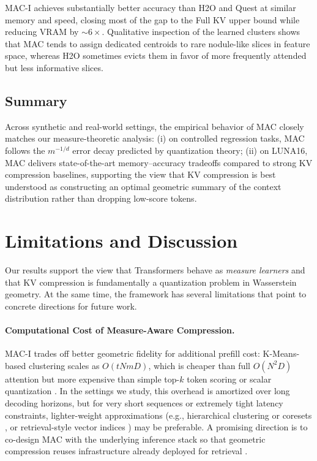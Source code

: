 \documentclass{article}
\theoremstyle{plain}
\theoremstyle{definition}
\theoremstyle{remark}
\begin{document}
MAC-I achieves substantially better accuracy than H2O and Quest at similar memory and
speed, closing most of the gap to the Full KV upper bound while reducing VRAM by
$\sim 6\times$. Qualitative inspection of the learned clusters shows that MAC tends to
assign dedicated centroids to rare nodule-like slices in feature space, whereas H2O
sometimes evicts them in favor of more frequently attended but less informative slices.

\subsection{Summary}
\label{sec:exp_summary}

Across synthetic and real-world settings, the empirical behavior of MAC closely matches
our measure-theoretic analysis: (i) on controlled regression tasks, MAC follows the
$m^{-1/d}$ error decay predicted by quantization theory; (ii) on LUNA16, MAC delivers
state-of-the-art memory--accuracy tradeoffs compared to strong KV compression baselines,
supporting the view that KV compression is best understood as constructing an optimal
geometric summary of the context distribution rather than dropping low-score tokens.

\section{Limitations and Discussion}
\label{sec:discussion}

Our results support the view that Transformers behave as \emph{measure learners} and that
KV compression is fundamentally a quantization problem in Wasserstein geometry. At the
same time, the framework has several limitations that point to concrete directions for
future work.

\paragraph{Computational Cost of Measure-Aware Compression.}
MAC-I trades off better geometric fidelity for additional prefill cost: K-Means-based
clustering scales as $O(t N m D)$, which is cheaper than full $O(N^2 D)$ attention but
more expensive than simple top-$k$ token scoring \citep{zhang2024h2o,liu2024scissorhands}
or scalar quantization \citep{liu2024kivi}. In the settings we study, this overhead is
amortized over long decoding horizons, but for very short sequences or extremely tight
latency constraints, lighter-weight approximations (e.g., hierarchical clustering or
coresets \citep{ge2024model}, or retrieval-style vector indices \citep{gao2024retrieval})
may be preferable. A promising direction is to co-design MAC with the underlying
inference stack so that geometric compression reuses infrastructure already deployed for
retrieval \citep{tang2024quest,bertsch2024unlimiformer}.
\end{document}
